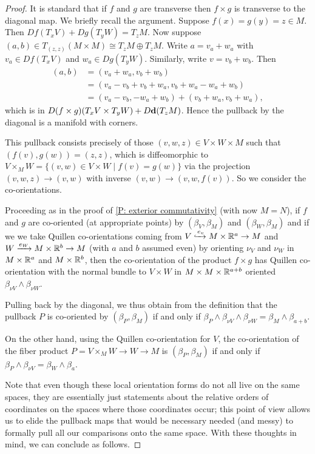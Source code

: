 \begin{proof}
	It is standard that if $f$ and $g$ are transverse then $f \times g$ is transverse to the diagonal map.
	We briefly recall the argument.
	Suppose $f(x) = g(y) = z \in M$.
	Then $Df(T_xV)+Dg(T_yW) = T_zM$.
	Now suppose $(a,b) \in T_{(z,z)}(M \times M) \cong T_zM \oplus T_zM$.
	Write $a = v_a+w_a$ with $v_a \in Df(T_xV)$ and $w_a \in Dg(T_yW)$.
	Similarly, write $v = v_b+w_b$.
	Then
	\begin{align*}
		(a,b)& = (v_a+w_a,v_b+w_b)\\
		& = (v_a-v_b+v_b+w_a, v_b+w_a-w_a+w_b)\\
		& = (v_a-v_b,-w_a+w_b)+(v_b+w_a, v_b+w_a),
	\end{align*}
	which is in $D(f \times g)(T_xV \times T_yW)+D\mathbf{d}(T_zM)$.
	Hence the pullback by the diagonal is a manifold with corners.

	This pullback consists precisely of those $(v,w,z) \in V \times W \times M$ such that $(f(v),g(w)) = (z,z)$, which is diffeomorphic to $V \times_M W = \{(v,w) \in V \times W \mid f(v) = g(w)\}$ via the projection $(v,w,z) \to (v,w)$ with inverse $(v,w) \to (v,w,f(v))$.
	So we consider the co-orientations.

	Proceeding as in the proof of \cref{P: exterior commutativity} (with now $M = N$), if $f$ and $g$ are co-oriented (at appropriate points) by $(\beta_V,\beta_M)$ and $(\beta_W,\beta_M)$ and if we we take Quillen co-orientations coming from $V\xhookrightarrow{e_v} M \times \mathbb{R}^a \to M$ and $W\xrightarrow{e_W} M \times \mathbb{R}^b \to M$ (with $a$ and $b$ assumed even) by orienting $\nu_V$ and $\nu_W$ in $M \times \mathbb{R}^a$ and $M \times \mathbb{R}^b$, then the co-orientation of the product $f \times g$ has Quillen co-orientation with the normal bundle to $V \times W$ in $M \times M \times \mathbb{R}^{a+b}$ oriented $\beta_{\nu V} \wedge \beta_{\nu W}$.

	Pulling back by the diagonal, we thus obtain from the definition that the pullback $P$ is co-oriented by $(\beta_P,\beta_M)$ if and only if $\beta_P \wedge \beta_{\nu V} \wedge \beta_{\nu W} = \beta_M \wedge \beta_{a+b}$.

	On the other hand, using the Quillen co-orientation for $V$, the co-orientation of the fiber product $P = V \times_M W \to W \to M$ is $(\beta_P,\beta_M)$ if and only if $\beta_P \wedge \beta_{\nu V} = \beta_W \wedge \beta_a$.

	Note that even though these local orientation forms do not all live on the same spaces, they are essentially just statements about the relative orders of coordinates on the spaces where those coordinates occur; this point of view allows us to elide the pullback maps that would be necessary needed (and messy) to formally pull all our comparisons onto the same space.
	With these thoughts in mind, we can conclude as follows.


\end{proof}

